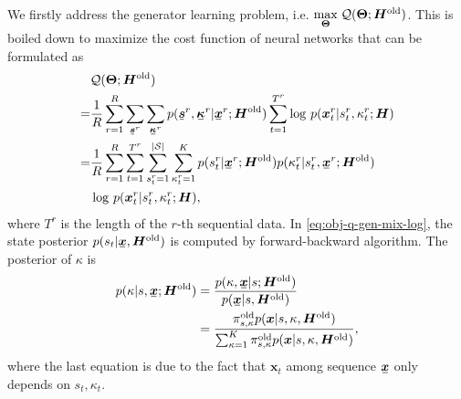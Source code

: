 \documentclass[letterpaper]{article} %
\newcommand{\ubar}[1]{\mkern2mu\underline{\mkern-2mu #1\mkern-2mu}\mkern2mu}
\newcommand{\ubm}[1]{\ubar{\bm{#1}}}
\newcommand{\ubmr}[2]{\ubar{\bm{#1}}^{#2}}
\newcommand{\bmtr}[3]{\bm{#1}^{#3}_{#2}}
\newcommand{\smtr}[3]{{#1}^{#3}_{#2}}
\begin{document}
We firstly address the generator learning problem, i.e. $\underset{\bm{\Theta}}{\max}\; \mathcal{Q}(\bm{\Theta}; \bm{H}^{\mathrm{old}})$. This is boiled down to maximize the cost function of neural networks that can be formulated as
\begin{align}\label{eq:obj-q-gen-mix-log}
  &\Qq(\bm{\Theta}; \bm{H}^{\mathrm{old}}) \nonumber \\
  = &\frac{1}{R}\sum_{r=1}^{R}\sum_{\ubmr{s}{r}}\sum_{\ubmr{\kappa}{r}}{p(\ubmr{s}{r}, \ubmr{\kappa}{r}| \ubmr{x}{r}; \bm{H}^{\mathrm{old}})} \sum_{t=1}^{{T}^{r}}\log\,p(\bmtr{x}{t}{r} | \smtr{s}{t}{r}, \smtr{\kappa}{t}{r}; \bm{H}) \nonumber \\
  =& \frac{1}{R}\sum_{r=1}^{R} \sum_{t=1}^{{T}^{r}} \sum_{\smtr{s}{t}{r}=1}^{|\Ss|}  \sum_{\smtr{\kappa}{t}{r}=1}^{K}p(\smtr{s}{t}{r}| \ubmr{x}{r}; \bm{H}^{\mathrm{old}})p(\smtr{\kappa}{t}{r}|\smtr{s}{t}{r}, \ubmr{x}{r}; \bm{H}^{\mathrm{old}}) \nonumber\\
  &  \log\, p(\bmtr{x}{t}{r} | \smtr{s}{t}{r}, \smtr{\kappa}{t}{r}; \bm{H}), 
\end{align}
where $T^r$ is the length of the $r$-th sequential data. In \eqref{eq:obj-q-gen-mix-log}, the state posterior $p(s_t| \ubm{x}, \bm{H}^{\mathrm{old}})$ is computed by forward-backward algorithm. The posterior of $\kappa$ is
\begin{align}\label{eq:kappa-posterior}
  p(\kappa| s, \ubm{x}; \bm{H}^{\mathrm{old}})
  &=  \frac{p(\kappa, \ubm{x}| s; \bm{H}^{\mathrm{old}})}{p(\ubm{x}| s,\bm{H}^{\mathrm{old}})} \nonumber \\
  & = \frac{\pi_{s, \kappa}^{\mathrm{old}} p(\bm{x}| s, \kappa, \bm{H}^{\mathrm{old}})}{\sum_{\kappa=1}^{K}  \pi_{s, \kappa}^{\mathrm{old}} p(\bm{x}| s, \kappa,\bm{H}^{\mathrm{old}})},
\end{align}
where the last equation is due to the fact that $\bm{x}_t$ among sequence $\ubm{x}$ only depends on $s_t, \kappa_t$. 
\end{document}

